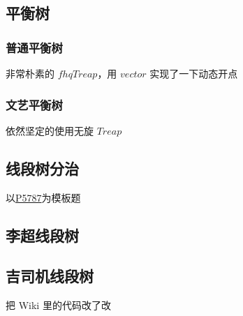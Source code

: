 \documentclass[12pt]{article}
\begin{document}


\newpage

\subsection{平衡树}

\subsubsection{普通平衡树}

非常朴素的 $fhqTreap$，用 $vector$ 实现了一下动态开点



\newpage

\subsubsection{文艺平衡树}

依然坚定的使用无旋 $Treap$



\newpage

\subsection{线段树分治}

以\href{https://www.luogu.com.cn/problem/P5787}{P5787}为模板题



\newpage

\subsection{李超线段树}



\newpage

\subsection{吉司机线段树}

把 Wiki 里的代码改了改


\end{document}
